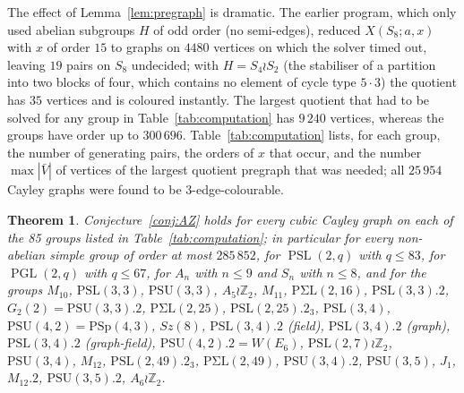 \documentclass[11pt,a4paper]{article}
\newtheorem{theorem}{Theorem}[section]
\theoremstyle{definition}
\theoremstyle{remark}
\newcommand{\ord}{\operatorname{ord}}
\newcommand{\PSL}{\operatorname{PSL}}
\newcommand{\PGL}{\operatorname{PGL}}
\newcommand{\X}[3]{X(#1;#2,#3)}
\begin{document}
The effect of Lemma~\ref{lem:pregraph} is dramatic.  The earlier program, which only used abelian subgroups $H$ of odd order (no semi-edges), reduced $\X{S_8}{a}{x}$ with $x$ of order $15$ to graphs on $4480$ vertices on which the solver timed out, leaving $19$ pairs on $S_8$ undecided; with $H=S_4\wr S_2$ (the stabiliser of a partition into two blocks of four, which contains no element of cycle type $5\cdot3$) the quotient has $35$ vertices and is coloured instantly.  The largest quotient that had to be solved for any group in Table~\ref{tab:computation} has $9\,240$ vertices, whereas the groups have order up to $300\,696$.  Table~\ref{tab:computation} lists, for each group, the number of generating pairs, the orders of $x$ that occur, and the number $\max|\bar V|$ of vertices of the largest quotient pregraph that was needed; all $25\,954$ Cayley graphs were found to be $3$-edge-colourable.

\begin{table}[ht]
\centering
\small

\caption{Computer verification of Conjecture~\ref{conj:AZ}.  For each group the number of generating pairs $(a,x)$ with $a^2=1$, $\ord(x)$ odd, up to conjugation and inversion of $x$, is listed, together with the orders of $x$ that occur and the number of vertices of the largest quotient pregraph that had to be solved; every corresponding cubic Cayley graph was found to be $3$-edge-colourable.  $\PSL(3,4).2$ (field), (graph), (graph-field) are the three index-two extensions of $\PSL(3,4)$, by a field, a graph and a graph-field automorphism respectively.  Groups of order at most $1280$ are included as a consistency check against \cite{PSV13}.}
\label{tab:computation}
\end{table}

\begin{theorem}\label{thm:computation}
Conjecture~\ref{conj:AZ} holds for every cubic Cayley graph on each of the 85 groups listed in Table~\ref{tab:computation}; in particular for every non-abelian simple group of order at most $285\,852$, for $\PSL(2,q)$ with $q\le 83$, for $\PGL(2,q)$ with $q\le 67$, for $A_n$ with $n\le 9$ and $S_n$ with $n\le 8$, and for the groups $M_{10}$, $\mathrm{PSL}(3,3)$, $\mathrm{PSU}(3,3)$, $A_5\wr\mathbb{Z}_2$, $M_{11}$, $\mathrm{P\Sigma L}(2,16)$, $\mathrm{PSL}(3,3).2$, $G_2(2)=\mathrm{PSU}(3,3).2$, $\mathrm{P\Sigma L}(2,25)$, $\mathrm{PSL}(2,25).2_3$, $\mathrm{PSL}(3,4)$, $\mathrm{PSU}(4,2)=\mathrm{PSp}(4,3)$, $Sz(8)$, $\mathrm{PSL}(3,4).2$ (field), $\mathrm{PSL}(3,4).2$ (graph), $\mathrm{PSL}(3,4).2$ (graph-field), $\mathrm{PSU}(4,2).2=W(E_6)$, $\mathrm{PSL}(2,7)\wr\mathbb{Z}_2$, $\mathrm{PSU}(3,4)$, $M_{12}$, $\mathrm{PSL}(2,49).2_3$, $\mathrm{P\Sigma L}(2,49)$, $\mathrm{PSU}(3,4).2$, $\mathrm{PSU}(3,5)$, $J_1$, $M_{12}.2$, $\mathrm{PSU}(3,5).2$, $A_6\wr\mathbb{Z}_2$.
\end{theorem}
\end{document}
